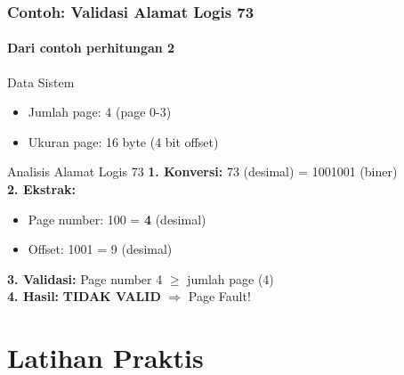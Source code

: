 \documentclass[t,aspectratio=169,xcolor=dvipsnames]{beamer}
\begin{document}
\begin{frame}[fragile]
    \frametitle{Contoh: Validasi Alamat Logis 73}
    \framesubtitle{Dari contoh perhitungan 2}
    \small

    \begin{block}{Data Sistem}
        \begin{itemize}
            \item Jumlah page: 4 (page 0-3)
            \item Ukuran page: 16 byte (4 bit offset)
        \end{itemize}
    \end{block}

    \begin{block}{Analisis Alamat Logis 73}
        \textbf{1. Konversi:} 73 (desimal) = 1001001 (biner) \\
        \textbf{2. Ekstrak:}
        \begin{itemize}
            \item Page number: 100 = \textbf{4} (desimal)
            \item Offset: 1001 = 9 (desimal)
        \end{itemize}
        \textbf{3. Validasi:} Page number 4 $\geq$ jumlah page (4) \\
        \textbf{4. Hasil:} \textbf{TIDAK VALID} $\Rightarrow$ Page Fault!
    \end{block}
\end{frame}

\section{Latihan Praktis}
\end{document}
